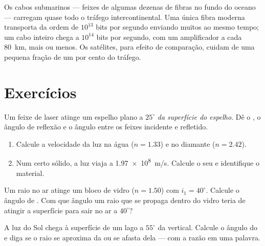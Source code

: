 \begin{remark}\label{rem:g10:refraction:datarates}
Os cabos submarinos --- feixes de algumas dezenas de fibras no fundo do
oceano --- carregam quase todo o tráfego intercontinental. Uma única
fibra moderna transporta da ordem de $10^{13}$ bits por segundo enviando
muitos  ao mesmo tempo; um cabo inteiro chega a
$10^{14}$ bits por segundo, com um amplificador a cada \qty{80}{km},
mais ou menos. Os satélites, para efeito de comparação, cuidam de uma
pequena fração de um por cento do tráfego.
\end{remark}

\section{Exercícios}

\begin{exercise}[$\star$]\label{exo:g10:refraction:1}
Um feixe de laser atinge um espelho plano a $25^\circ$ \emph{da
superfície do espelho}. Dê o , o ângulo de reflexão e
o ângulo entre os feixes incidente e refletido.
\end{exercise}

\begin{exercise}[$\star$]\label{exo:g10:refraction:2}
\begin{enumerate}
  \item Calcule a velocidade da luz na água ($n = 1.33$) e no diamante
        ($n = 2.42$).
  \item Num certo sólido, a luz viaja a \qty{1.97e8}{m/s}. Calcule o seu
         e identifique o material.
\end{enumerate}
\end{exercise}

\begin{exercise}[$\star$]\label{exo:g10:refraction:3}
Um raio no ar atinge um bloco de vidro ($n = 1.50$) com
$i_1 = 40^\circ$. Calcule o ângulo de . Com que ângulo um raio
que se propaga dentro do vidro teria de atingir a superfície para sair no
ar a $40^\circ$?
\end{exercise}

\begin{exercise}[$\star$]\label{exo:g10:refraction:4}
A luz do Sol chega à superfície de um lago a $55^\circ$ da vertical.
Calcule o ângulo do  e diga se o raio se aproxima da 
ou se afasta dela --- com a razão em uma palavra.
\end{exercise}

